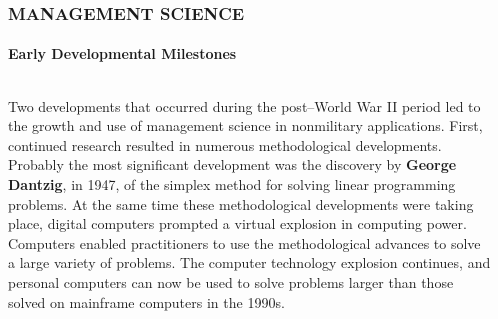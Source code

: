 \documentclass[14 pt]{beamer}
\begin{document}

\begin{frame}[t]
\frametitle{MANAGEMENT SCIENCE}
\framesubtitle{Early Developmental Milestones}
\begin{columns}[t]
\begin{column}{0.45\textwidth}
Two developments that occurred during the post–World War II period led to the growth and use of management science in nonmilitary applications.
\vskip0.5cm%
First, continued research resulted in numerous methodological developments. Probably the most significant development was the discovery by \textbf{George Dantzig}, in 1947, of the simplex method for solving linear programming problems.
\vskip0.5cm%
At the same time these methodological developments were taking place, digital computers prompted a virtual explosion in computing power. Computers enabled practitioners to use the methodological advances to solve a large variety of problems. The computer technology explosion continues, and personal computers can now be used to solve problems larger than those solved on mainframe computers in the 1990s.
\end{column}
\begin{column}{0.45\textwidth}
\end{column}
\end{columns}
\end{frame}

\end{document}
